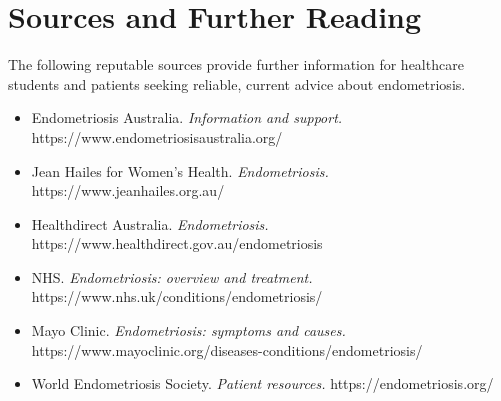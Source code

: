 \section*{Sources and Further Reading}
The following reputable sources provide further information for healthcare students and patients seeking reliable, current advice about endometriosis.
\begin{itemize}
    \item Endometriosis Australia. \textit{Information and support.} https://www.endometriosisaustralia.org/
    \item Jean Hailes for Women's Health. \textit{Endometriosis.} https://www.jeanhailes.org.au/
    \item Healthdirect Australia. \textit{Endometriosis.} https://www.healthdirect.gov.au/endometriosis
    \item NHS. \textit{Endometriosis: overview and treatment.} https://www.nhs.uk/conditions/endometriosis/
    \item Mayo Clinic. \textit{Endometriosis: symptoms and causes.} https://www.mayoclinic.org/diseases-conditions/endometriosis/
    \item World Endometriosis Society. \textit{Patient resources.} https://endometriosis.org/
\end{itemize}
